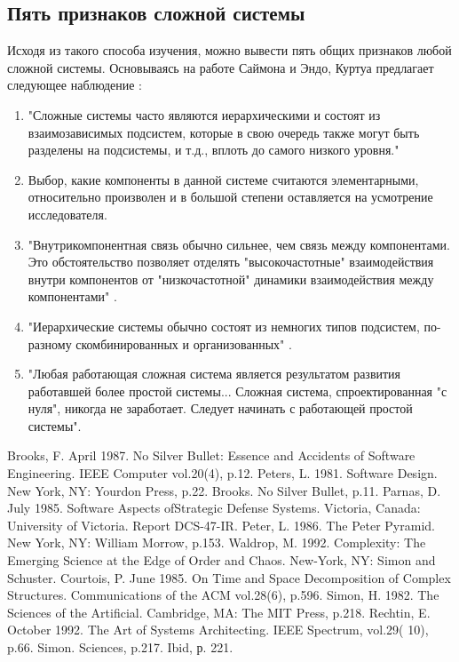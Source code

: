 \documentclass[10pt]{article}
\begin{document}
\subsection{Пять признаков сложной системы}
Исходя из такого способа изучения, можно вывести пять общих признаков любой сложной системы. Основываясь на работе Саймона и Эндо, Куртуа предлагает следующее наблюдение \cite{Courtois}: 
\begin{enumerate}
\it
\item "Сложные системы часто являются иерархическими и состоят из взаимозависимых подсистем, которые в свою очередь также могут быть разделены на подсистемы, и т.д., вплоть до самого низкого уровня."
\item Выбор, какие компоненты в данной системе считаются элементарными, относительно произволен и в большой степени оставляется на усмотрение исследователя.
\item "Внутрикомпонентная связь обычно сильнее, чем связь между компонентами. Это обстоятельство позволяет отделять "высокочастотные" взаимодействия внутри компонентов от "низкочастотной" динамики взаимодействия между компонентами" \cite{Sciences}. 
\item "Иерархические системы обычно состоят из немногих типов подсистем, по-разному скомбинированных и организованных" \cite{Ibid}.
\item "Любая работающая сложная система является результатом развития работавшей более простой системы... Сложная система, спроектированная "с нуля", никогда не заработает. Следует начинать с работающей простой системы".
\rm
\end{enumerate}

\begin{thebibliography}{0}
 Brooks, F. April 1987. No Silver Bullet: Essence and Accidents of Software Engineering. IEEE Computer vol.20(4), p.12. 
 Peters, L. 1981. Software Design. New York, NY: Yourdon Press, p.22. 
 Brooks. No Silver Bullet, p.11. 
 Parnas, D. July 1985. Software Aspects ofStrategic Defense Systems. Victoria, Canada: University of Victoria. Report DCS-47-IR. 
 Peter, L. 1986. The Peter Pyramid. New York, NY: William Morrow, p.153. 
 Waldrop, M. 1992. Complexity: The Emerging Science at the Edge of Order and Chaos. New-York, NY: Simon and Schuster. 
 Courtois, P. June 1985. On Time and Space Decomposition of Complex Structures. Communications of the ACM vol.28(6), p.596. 
 Simon, H. 1982. The Sciences of the Artificial. Cambridge, MA: The MIT Press, p.218. 
 Rechtin, E. October 1992. The Art of Systems Architecting. IEEE Spectrum, vol.29( 10), p.66. 
 Simon. Sciences, p.217. 
 Ibid, р. 221.
\end{thebibliography}
\end{document}
